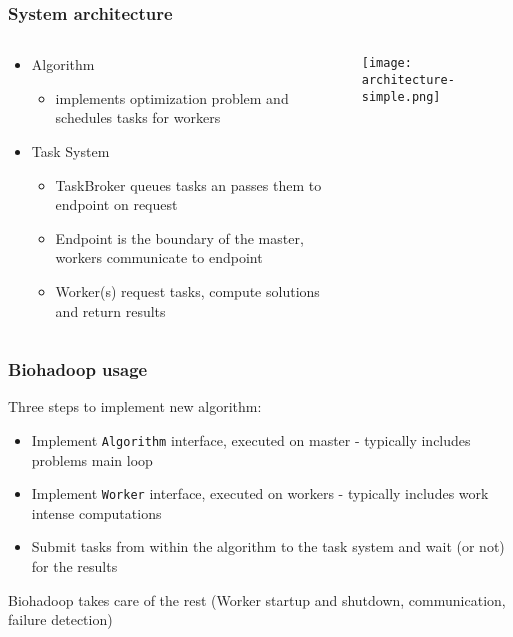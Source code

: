 \begin{frame}
  \frametitle{System architecture}
  \begin{columns}
    \begin{column}{.7\textwidth}
      \begin{itemize}
        \item Algorithm
	\begin{itemize}
	  \item implements optimization problem and schedules tasks for workers
	\end{itemize}
	\item Task System
	\begin{itemize}
	  \item TaskBroker queues tasks an passes them to endpoint on request
	  \item Endpoint is the boundary of the master, workers communicate to endpoint
	  \item Worker(s) request tasks, compute solutions and return results
        \end{itemize}
      \end{itemize}
      \vspace{1em}
    \end{column}
    \begin{column}{.3\textwidth}
      \begin{center}
	\texttt{[image: architecture-simple.png]}
      \end{center}
    \end{column}
  \end{columns}
\end{frame}
\begin{frame}
  \frametitle{Biohadoop usage}
  Three steps to implement new algorithm:
  \begin{itemize}
    \item Implement \texttt{Algorithm} interface, executed on master - typically includes problems main loop
    \item Implement \texttt{Worker} interface, executed on workers - typically includes work intense computations
    \item Submit tasks from within the algorithm to the task system and wait (or not) for the results
  \end{itemize}
  \vspace{1em}
  Biohadoop takes care of the rest (Worker startup and shutdown, communication, failure detection)
\end{frame}

